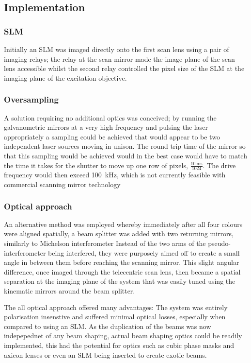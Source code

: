 \subsection{Implementation}
\subsubsection{SLM}
Initially an SLM was imaged directly onto the first scan lens using a pair of imaging relays; the relay at the scan mirror made the image plane of the scan lens accessible whilst the second relay controlled the pixel size of the SLM at the imaging plane of the excitation objective.

\subsubsection{Oversampling}
A solution requiring no additional optics was conceived; by running the galvanometric mirrors at a very high frequency and pulsing the laser appropriately a sampling could be achieved that would appear to be two independent laser sources moving in unison.
The round trip time of the mirror so that this sampling would be achieved would in the best case would have to match the time it takes for the shutter to move up one row of pixels, $\frac{\SI{10}{\milli\second}}{1024}$.
The drive frequency would then exceed \SI{100}{\kilo\hertz}, which is not currently feasible with commercial scanning mirror technology

\subsubsection{Optical approach}
An alternative method was employed whereby immediately after all four colours were aligned spatially, a beam splitter was added with two returning mirrors, similarly to Michelson interferometer
Instead of the two arms of the pseudo-interferometer being interfered, they were purposely aimed off to create a small angle in between them before reaching the scanning mirror.
This slight angular difference, once imaged through the telecentric scan lens, then became a spatial separation at the imaging plane of the system that was easily tuned using the kinematic mirrors around the beam splitter.

The all optical approach offered many advantages: The system was entirely polarisation insenstive and suffered minimal optical losses, especially when compared to using an SLM. As the duplication of the beams was now indepepednet of any beam shaping, actual beam shaping optics could be readily implemented, this had the potential for optics such as cubic phase masks and axicon lenses or even an SLM being inserted to create exotic beams.

